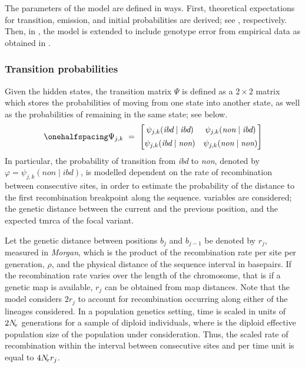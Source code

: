 %

%

The parameters of the model are defined in  ways.
First, theoretical expectations for transition, emission, and initial probabilities are derived; see , respectively.
Then, in , the model is extended to include genotype error from empirical data as obtained in .




%
\subsubsection{Transition probabilities}
\label{sec:HmmTrans}
%

Given the  hidden states, the transition matrix $\Psi$ is defined as a $2 \times 2$ matrix which stores the probabilities of moving from one state into another state, as well as the probabilities of remaining in the same state; see below.
\begin{equation}\label{eq:transmatrix}\onehalfspacing
\Psi_{j,k}  ~=~
\begin{bmatrix}
	\psi_{j,k}(\textit{ibd}\mid\textit{ibd})  &
	\psi_{j,k}(\textit{non}\mid\textit{ibd})  \\[1ex]
	\psi_{j,k}(\textit{ibd}\mid\textit{non})  &
	\psi_{j,k}(\textit{non}\mid\textit{non})  \\
\end{bmatrix}
\end{equation}
In particular, the probability of transition from \emph{ibd} to \emph{non}, denoted by ${\varphi = \psi_{j,k}(\textit{non}\mid\textit{ibd})}$, is modelled dependent on the rate of recombination between consecutive sites, in order to estimate the probability of the distance to the first recombination breakpoint along the sequence.
 variables are considered; the genetic distance between the current and the previous position, and the expected \gls{tmrca} of the focal \fk{} variant.

Let the genetic distance between positions $b_j$ and $b_{j-1}$ be denoted by $r_j$, measured in \emph{Morgan}, which is the product of the recombination rate per site per generation, $\rho$, and the physical distance of the sequence interval in basepairs.
If the recombination rate varies over the length of the chromosome, that is if a genetic map is available, $r_j$ can be obtained from map distances.
Note that the model considers ${2 r_j}$ to account for recombination occurring along either of the  lineages considered.
In a population genetics setting, time is scaled in units of $2N_{\!e}$ generations for a sample of diploid individuals, where \Ne is the diploid effective population size of the population under consideration.
Thus, the scaled rate of recombination within the interval between consecutive sites and per time unit is equal to ${4N_{\!e} r_j}$.

